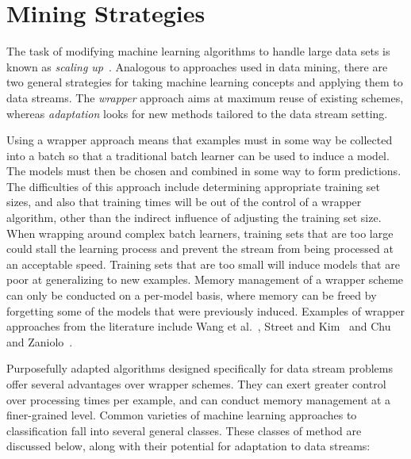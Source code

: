 \section{Mining Strategies} 

The task of modifying machine learning algorithms to handle large data sets is known as {\em scaling up}~\cite{ml_scaleup}.
Analogous to approaches used in data mining, there are two general strategies for taking machine learning concepts and applying them to data streams. The \emph{wrapper} approach aims at maximum reuse of existing schemes, whereas \emph{adaptation} looks for new methods tailored to the data stream setting.

Using a wrapper approach means that examples must in some way be collected into a batch so that a traditional batch learner can be used to induce a model. The models must then be chosen and combined in some way to form predictions. The difficulties of this approach include determining appropriate training set sizes, and also that training times will be out of the control of a wrapper algorithm, other than the indirect influence of adjusting the training set size. When wrapping around complex batch learners, training sets that are too large could stall the learning process and prevent the stream from being processed at an acceptable speed. Training sets that are too small will induce models that are poor at generalizing to new examples. Memory management of a wrapper scheme can only be conducted on a per-model basis, where memory can be freed by forgetting some of the models that were previously induced. Examples of wrapper approaches from the literature include Wang et al.~\cite{cdensemble}, Street and Kim~\cite{sea} and Chu and Zaniolo~\cite{fastlightboost}. 

Purposefully adapted algorithms designed specifically for data stream problems offer several advantages over wrapper schemes. They can exert greater control over processing times per example, and can conduct memory management at a finer-grained level.
Common varieties of machine learning approaches to classification fall into several general classes. These classes of method are discussed below, along with their potential for adaptation to data streams:


